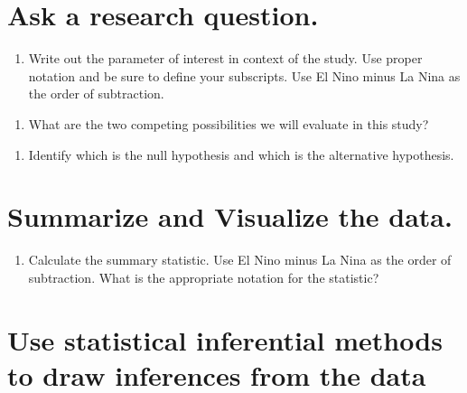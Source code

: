 \documentclass[
]{report}
\providecommand{\tightlist}{%
  \setlength{\itemsep}{0pt}\setlength{\parskip}{0pt}}
\begin{document}
\hypertarget{ask-a-research-question.-1}{%
\section{Ask a research question.}\label{ask-a-research-question.-1}}

\begin{enumerate}
\def\labelenumi{\arabic{enumi}.}
\setcounter{enumi}{5}
\tightlist
\item
  Write out the parameter of interest in context of the study. Use proper notation and be sure to define your subscripts. Use El Nino minus La Nina as the order of subtraction.
\end{enumerate}

\vspace{1in}

\begin{enumerate}
\def\labelenumi{\arabic{enumi}.}
\setcounter{enumi}{6}
\tightlist
\item
  What are the two competing possibilities we will evaluate in this study?
\end{enumerate}

\vspace{1in}

\begin{enumerate}
\def\labelenumi{\arabic{enumi}.}
\setcounter{enumi}{7}
\tightlist
\item
  Identify which is the null hypothesis and which is the alternative hypothesis.
\end{enumerate}

\vspace{1in}

\hypertarget{summarize-and-visualize-the-data.}{%
\section{Summarize and Visualize the data.}\label{summarize-and-visualize-the-data.}}

\begin{enumerate}
\def\labelenumi{\arabic{enumi}.}
\setcounter{enumi}{8}
\tightlist
\item
  Calculate the summary statistic. Use El Nino minus La Nina as the order of subtraction. What is the appropriate notation for the statistic?
\end{enumerate}

\vspace{0.5in}

\hypertarget{use-statistical-inferential-methods-to-draw-inferences-from-the-data-1}{%
\section{Use statistical inferential methods to draw inferences from the data}\label{use-statistical-inferential-methods-to-draw-inferences-from-the-data-1}}
\end{document}
